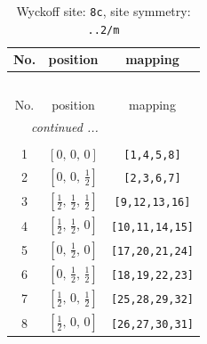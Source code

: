 \documentclass[fleqn,8pt]{jsarticle}
\begin{document}
\begin{longtable}{ccc}
\caption{Wyckoff site: {\tt 8c}, site symmetry: {\tt ..2/m}}
 \\
 \hline \hline
No. & position & mapping \\ \hline \endfirsthead

\multicolumn{2}{l}{\tablename\ \thetable{}} \\
 \hline \hline
No. & position & mapping \\ \hline \endhead

 \hline \hline
\multicolumn{2}{r}{\footnotesize\it continued ...} \\ \endfoot

 \hline \hline
\multicolumn{2}{r}{} \\ \endlastfoot

1 & $\left[ 0,\, 0,\, 0 \right]$ & {\tt [1,4,5,8]} \\ \hline
2 & $\left[ 0,\, 0,\, \frac{1}{2} \right]$ & {\tt [2,3,6,7]} \\ \hline
3 & $\left[ \frac{1}{2},\, \frac{1}{2},\, \frac{1}{2} \right]$ & {\tt [9,12,13,16]} \\ \hline
4 & $\left[ \frac{1}{2},\, \frac{1}{2},\, 0 \right]$ & {\tt [10,11,14,15]} \\ \hline
5 & $\left[ 0,\, \frac{1}{2},\, 0 \right]$ & {\tt [17,20,21,24]} \\ \hline
6 & $\left[ 0,\, \frac{1}{2},\, \frac{1}{2} \right]$ & {\tt [18,19,22,23]} \\ \hline
7 & $\left[ \frac{1}{2},\, 0,\, \frac{1}{2} \right]$ & {\tt [25,28,29,32]} \\ \hline
8 & $\left[ \frac{1}{2},\, 0,\, 0 \right]$ & {\tt [26,27,30,31]} \\
\end{longtable}
\renewcommand{\arraystretch}{1.2}
\end{document}
